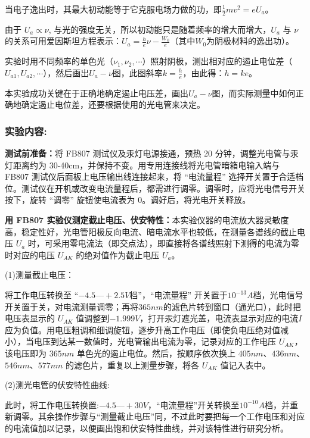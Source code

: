 \documentclass[10pt,a4paper]{ctexart}
\begin{document}
    当电子逸出时，其最大初动能等于它克服电场力做的功，即\(\frac{1}{2}mv^2 = eU_a\)。
    
    由于 $U_a \propto \nu $, 与光的强度无关，所以初动能只是随着频率的增大而增大，$U_a$ 与 $\nu $ 的关系可用爱因斯坦方程表示：\(U_a = \frac{h}{e}\nu - \frac{W_0}{e}\)（其中\(W_0\)为阴极材料的逸出功）。
    
    实验时用不同频率的单色光（\(\nu_1, \nu_2, \cdots\)）照射阴极，测出相对应的遏止电位差（\(U_{a1}, U_{a2}, \cdots\)），然后画出\(U_a - \nu\)图，此图斜率\(k = \frac{h}{e}\)，由此得：\(h = ke\)。
    
    本实验成功关键在于正确地确定遏止电压差，画出\(U_a - \nu\)图，而实际测量中如何正确地确定遏止电位差，还要根据使用的光电管来决定。
    
    \subsubsection*{实验内容:}

    \textbf{测试前准备：}将 FB807 测试仪及汞灯电源接通，预热 20 分钟，调整光电管与汞灯距离约为 30-40cm，并保持不变。用专用连接线将光电管暗箱电输入端与 FB807 测试仪后面板上电压输出线连接起来，将 “电流量程” 选择开关置于合适档位。测试仪在开机或改变电流量程后，都需进行调零。调零时，应将光电信号开关按下，旋转 “调零” 旋钮使电流表为 0。调好后，将光电开关释放。
    
    \textbf{用 FB807 实验仪测定截止电压、伏安特性：}本实验仪器的电流放大器灵敏度高，稳定性好，光电管阳极反向电流、暗电流水平也较低，在测量各谱线的截止电压 $U_a$ 时，可采用零电流法（即交点法），即直接将各谱线照射下测得的电流为零时对应的电压 $U_{AK}$ 的绝对值作为截止电压 $U_a$。
    
    (1)测量截止电压：
    
    将工作电压转换至 “$-4.5—+ 2.5V $档”，“电流量程” 开关置于\(10^{-13}A\)档，光电信号开关置于关，对电流测量调零；再将$ 365nm $的滤色片转到窗口（通光口），此时把电压表显示的 $U_{AK}$ 值调整到$ - 1.999V$，打开汞灯遮光盖，电流表显示对应的电流$I$应为负值。用电压粗调和细调旋钮，逐步升高工作电压（即使负电压绝对值减小），当电压到达某一数值时，光电管输出电流为零，记录对应的工作电压 $U_{AK}$，该电压即为 $365nm$ 单色光的遏止电位。然后，按顺序依次换上 $405nm$、$436nm$、$546nm$、$577nm$ 的滤色片，重复以上测量步骤，将各 $U_{AK}$ 值记入表中。

    (2)测光电管的伏安特性曲线:

    此时，将工作电压转换置:$-4.5—+30V$，“电流量程”开关转换至\(10^{-10}A\)档，并重新调零。其余操作步骤与“测量截止电压”同，不过此时要把每一个工作电压和对应的电流值加以记录，以便画出饱和伏安特性曲线，并对该特性进行研究分析。
\end{document}
